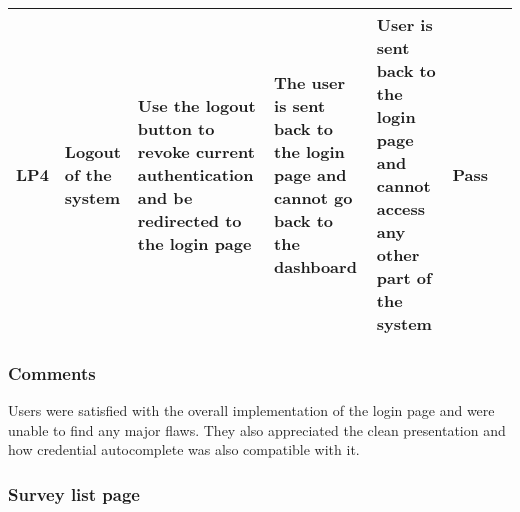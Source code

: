 \begin{longtable}{|p{}|p{}|p{}|p{}|p{}|p{}|p{}|}
  \hline
  LP4 & Logout of the system           & Use the logout button to revoke current authentication and be redirected to the login page     & The user is sent back to the login page and cannot go back to the dashboard                                                        & User is sent back to the login page and cannot access any other part of the system                                                                         & Pass           &         \\     
  \hline
\end{longtable}

\subsubsection*{Comments}
Users were satisfied with the overall implementation of the login page and were unable to find any major flaws.
They also appreciated the clean presentation and how credential autocomplete was also compatible with it.

\subsubsection{Survey list page}

